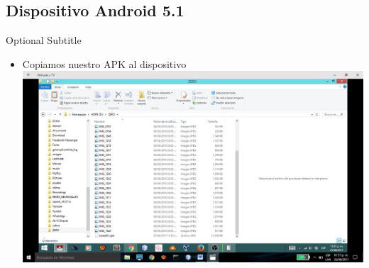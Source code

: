 \documentclass{beamer}
\begin{document}
\subsection{Dispositivo Android 5.1}

\begin{frame}{33}{Optional Subtitle}
  \begin{itemize}
  \item {
    Copiamos nuestro APK al dispositivo
  }
  \includegraphics[width=\linewidth]{image/IU33}
  \end{itemize}
\end{frame}
\end{document}
